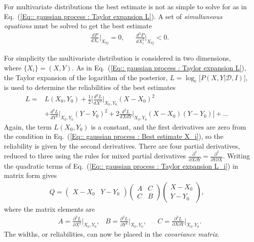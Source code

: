 \documentclass[twoside,english]{uiofysmaster}
\begin{document}
{{For multivariate distributions the best estimate is not as simple to solve for as in Eq.~(\ref{Eq:: gaussian process : Taylor expansion L}). A set of \textit{simultaneous equations} must be solved to get the best estimate
\begin{align}\label{Eq:: gaussian process : Best estimate X_i}
&\frac{dP}{dX_i} \Big|_{X_{0j}} =0, &&\frac{d^2P}{dX_i^2} \Big|_{X_{0j}} < 0.
\end{align}

For simplicity the multivariate distribution is considered in two dimensions, where $\{ X_i \}=(X, Y)$. As in Eq.~(\ref{Eq:: gaussian process : Taylor expansion L}), the Taylor expansion of the logarithm of the posterior, $L = \log_e \Big[ P(X, Y |\mathcal{D}, I) \Big]$, is used to determine the reliabilities of the best estimates
\begin{align}\label{Eq:: gaussian process : Taylor expansion L_i}
L =& L(X_0, Y_0) + \frac{1}{2} \Big[ \frac{d^2L}{dX^2}  \Big|_{X_0, Y_0}(X-X_0)^2 \nonumber \\
& + \frac{d^2L}{dY^2}  \Big|_{X_0, Y_0}(Y-Y_0)^2 + 2 \frac{d^2L}{dXdY}  \Big|_{X_0, Y_0}(X-X_0)(Y-Y_0) \Big] +...
\end{align}
Again, the term $L(X_0, Y_0)$ is a constant, and the first derivatives are zero from the condition in Eq.~(\ref{Eq:: gaussian process : Best estimate X_i}), so the reliability is given by the second derivatives. There are four partial derivatives, reduced to three using the rules for mixed partial derivatives $\frac{\partial^2}{\partial X \partial Y} = \frac{\partial^2}{\partial Y \partial X}$. Writing the quadratic terms of Eq.~(\ref{Eq:: gaussian process : Taylor expansion L_i}) in matrix form gives
\begin{align}
Q = 
\begin{pmatrix}
X-X_0 & Y -Y_0
\end{pmatrix}
\begin{pmatrix}
A & C\\
C & B
\end{pmatrix}
\begin{pmatrix}
X -X_0\\
Y-Y_0
\end{pmatrix},
\end{align}
where the matrix elements are 
\begin{align}\label{Eq:: gaussian process : covariance matrix ABC}
&A = \frac{\partial^2 L}{\partial X^2} \Big|_{X_0, Y_0}, &B = \frac{\partial^2 L}{\partial Y^2} \Big|_{X_0, Y_0}, &&C = \frac{\partial^2 L}{\partial X \partial Y} \Big|_{X_0, Y_0}.
\end{align}
The widths, or reliabilities, can now be placed in the \textit{covariance matrix}.


}}
\end{document}
